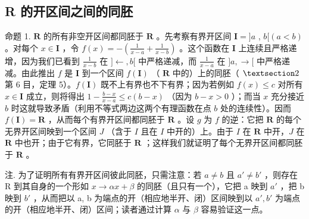 \subsection{R 的开区间之间的同胚}

命题 1. \(\mathbf{R}\) 的所有非空开区间都同胚于 \(\mathbf{R}\) 。先考察有界开区间 \(\mathbf{I} = ]a\) , \(b[(a < b)\) 。对每个 \(x \in \mathbf{I}\) ，令 \(f(x) = -\left(\frac{1}{x - a} + \frac{1}{x - b}\right)\) 。这个函数在 \(\mathbf{I}\) 上连续且严格递增，因为我们已看到 \(\frac{1}{x - b}\) 在 \(]\leftarrow, b[\) 中严格递减，而 \(\frac{1}{x - a}\) 在 \(]a, \rightarrow[\) 中严格递减。由此推出 \(f\) 是 \(\mathbf{I}\) 到一个区间 \(f(\mathbf{I})\) （ \(\mathbf{R}\) 中的）上的同胚（ \(\S 2\) 第 6 目，定理 5）。\(f(\mathbf{I})\) 既不上有界也不下有界；因为若例如 \(f(x) \leqslant c\) 对所有 \(x \in \mathbf{I}\) 成立，则将得出 \(1 - \frac{b - x}{x - a} \leqslant c(b - x)\) （因为 \(b - x > 0\) ）；而当 \(x\) 充分接近 \(b\) 时这就导致矛盾（利用不等式两边这两个有理函数在点 \(b\) 处的连续性）。因而 \(f(\mathbf{I}) = \mathbf{R}\) ，从而每个有界开区间都同胚于 \(\mathbf{R}\) 。设 \(g\) 为 \(f\) 的逆：它把 \(\mathbf{R}\) 的每个无界开区间映到一个区间 \(J\) （含于 \(I\) 且在 \(I\) 中开的）上。由于 \(I\) 在 \(\mathbf{R}\) 中开，\(J\) 在 \(\mathbf{R}\) 中也开；由于它有界，它同胚于 \(\mathbf{R}\) ；这样我们就证明了每个无界开区间都同胚于 \(\mathbf{R}\) 。

注. 为了证明所有有界开区间彼此同胚，只需注意：若 \(a \neq b\) 且 \(a' \neq b'\) ，则存在 R 到其自身的一个形如 \(x \to \alpha x + \beta\) 的同胚（且只有一个），它把 a 映到 \(a'\) ，把 b 映到 \(b'\) ，从而把以 a, b 为端点的开（相应地半开、闭）区间映到以 \(a', b'\) 为端点的开（相应地半开、闭）区间；读者通过计算 \(\alpha\) 与 \(\beta\) 容易验证这一点。

